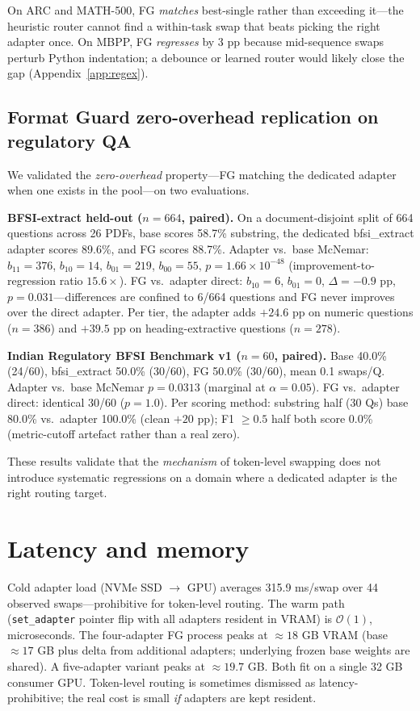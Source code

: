 \documentclass{article}
\begin{document}
On ARC and MATH-500, FG \emph{matches} best-single rather than exceeding it---the heuristic router cannot find a within-task swap that beats picking the right adapter once. On MBPP, FG \emph{regresses} by 3 pp because mid-sequence swaps perturb Python indentation; a debounce or learned router would likely close the gap (Appendix~\ref{app:regex}).

\subsection{Format Guard zero-overhead replication on regulatory QA}
\label{sec:bfsi}

We validated the \emph{zero-overhead} property---FG matching the dedicated adapter when one exists in the pool---on two evaluations.

\textbf{BFSI-extract held-out ($n=664$, paired).} On a document-disjoint split of 664 questions across 26 PDFs, base scores 58.7\% substring, the dedicated bfsi\_extract adapter scores 89.6\%, and FG scores 88.7\%. Adapter vs.\ base McNemar: $b_{11}{=}376$, $b_{10}{=}14$, $b_{01}{=}219$, $b_{00}{=}55$, $p = 1.66 \times 10^{-48}$ (improvement-to-regression ratio $15.6\times$). FG vs.\ adapter direct: $b_{10}{=}6$, $b_{01}{=}0$, $\Delta = -0.9$ pp, $p = 0.031$---differences are confined to 6/664 questions and FG never improves over the direct adapter. Per tier, the adapter adds $+24.6$ pp on numeric questions ($n=386$) and $+39.5$ pp on heading-extractive questions ($n=278$).

\textbf{Indian Regulatory BFSI Benchmark v1 ($n=60$, paired).} Base 40.0\% (24/60), bfsi\_extract 50.0\% (30/60), FG 50.0\% (30/60), mean 0.1 swaps/Q. Adapter vs.\ base McNemar $p = 0.0313$ (marginal at $\alpha = 0.05$). FG vs.\ adapter direct: identical 30/60 ($p = 1.0$). Per scoring method: substring half (30 Qs) base 80.0\% vs.\ adapter 100.0\% (clean $+20$ pp); F1 $\geq 0.5$ half both score 0.0\% (metric-cutoff artefact rather than a real zero).

These results validate that the \emph{mechanism} of token-level swapping does not introduce systematic regressions on a domain where a dedicated adapter is the right routing target.

\section{Latency and memory}
\label{sec:latency}

Cold adapter load (NVMe SSD $\rightarrow$ GPU) averages 315.9 ms/swap over 44 observed swaps---prohibitive for token-level routing. The warm path (\texttt{set\_adapter} pointer flip with all adapters resident in VRAM) is $\mathcal{O}(1)$, microseconds. The four-adapter FG process peaks at $\approx 18$ GB VRAM (base $\approx 17$ GB plus delta from additional adapters; underlying frozen base weights are shared). A five-adapter variant peaks at $\approx 19.7$ GB. Both fit on a single 32 GB consumer GPU. Token-level routing is sometimes dismissed as latency-prohibitive; the real cost is small \emph{if} adapters are kept resident.
\end{document}

